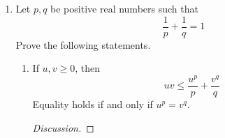 \documentclass[../psets.tex]{subfiles}
\begin{document}
\begin{enumerate}[label={\textbf{\arabic*.}}]
\begin{proof}
\begin{equation*}
        \end{equation*}
        Therefore,
        \begin{align*}
            \sum_{n=1}^{N-1}f(n) &= f(1)+\sum_{n=2}^{N-1}\int_{n-1}^nf(n)\dd{x}\tag*{Theorem 6.12d}\\
            &\leq f(1)+\sum_{n=2}^{N-1}\int_{n-1}^nf(x)\dd{x}\\
            &= f(1)+\int_1^{N-1}f(x)\dd{x}\tag*{Theorem 6.12c}
        \end{align*}
        for all $N=2,3,4,\dots$, thereby establishing the right inequality above.
    \end{proof}
    \item Let $p,q$ be positive real numbers such that
    \begin{equation*}
        \frac{1}{p}+\frac{1}{q} = 1
    \end{equation*}
    Prove the following statements.
    \begin{enumerate}
        \item If $u,v\geq 0$, then
        \begin{equation*}
            uv \leq \frac{u^p}{p}+\frac{v^q}{q}
        \end{equation*}
        Equality holds if and only if $u^p=v^q$.
        \begin{proof}[Discussion]



\end{proof}
\end{enumerate}
\end{enumerate}
\end{document}
